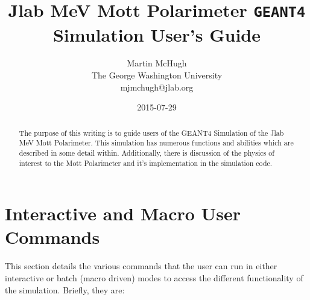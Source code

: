 \documentclass[11pt]{article}
\title{\textbf{Jlab MeV Mott Polarimeter \texttt{GEANT4} Simulation User's Guide}}
\author{Martin McHugh\\
		The George Washington University\\
		mjmchugh@jlab.org}
\date{2015-07-29}
\begin{document}
\maketitle

\begin{abstract}
The purpose of this writing is to guide users of the GEANT4 Simulation of the Jlab MeV Mott Polarimeter. This simulation has numerous functions and abilities which are described in some detail within. Additionally, there is discussion of the physics of interest to the Mott Polarimeter and it's implementation in the simulation code. 
\end{abstract}

\section*{Interactive and Macro User Commands}
This section details the various commands that the user can run in either interactive or batch (macro driven) modes to access the different functionality of the simulation. Briefly, they are:
\end{document}
